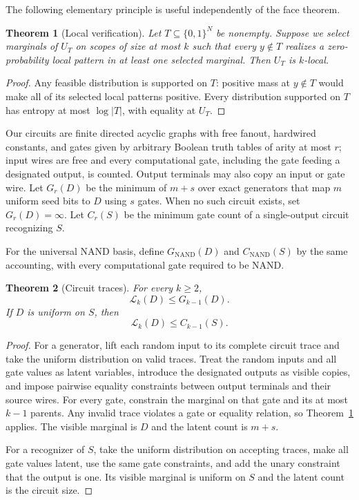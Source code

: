 \documentclass{article}
\newcommand{\LC}{\mathcal{L}}
\newcommand{\bits}{\{0,1\}}
\newtheorem{theorem}{Theorem}
\begin{document}
The following elementary principle is useful independently of the face
theorem.

\begin{theorem}[Local verification]\label{thm:local-verification}
Let $T\subseteq\bits^N$ be nonempty.  Suppose
we select marginals of $U_T$ on scopes of size at most $k$ such that every
$y\notin T$ realizes a zero-probability local pattern in at least one selected
marginal.  Then $U_T$ is $k$-local.
\end{theorem}

\begin{proof}
Any feasible distribution is supported on $T$: positive mass at $y\notin T$
would make all of its selected local patterns positive.  Every distribution
supported on $T$ has entropy at most $\log|T|$, with equality at $U_T$.
\end{proof}

Our circuits are finite directed acyclic graphs with free fanout, hardwired
constants, and gates given by arbitrary Boolean truth tables of arity at most
$r$; input wires are free and every computational gate, including the gate
feeding a designated output, is counted.  Output terminals may also copy an
input or gate wire.  Let $G_r(D)$ be the minimum of $m+s$ over exact generators
that map $m$ uniform seed bits to $D$ using $s$ gates.  When no such circuit
exists, set $G_r(D)=\infty$.  Let $C_r(S)$ be the minimum gate count of a
single-output circuit recognizing $S$.

For the universal NAND basis, define $G_{\mathrm{NAND}}(D)$ and
$C_{\mathrm{NAND}}(S)$ by the same accounting, with every computational gate
required to be NAND.

\begin{theorem}[Circuit traces]\label{thm:upper-bounds}
For every $k\ge2$,
\[
  \LC_k(D)\le G_{k-1}(D).
\]
If $D$ is uniform on $S$, then
\[
  \LC_k(D)\le C_{k-1}(S).
\]
\end{theorem}

\begin{proof}
For a generator, lift each random input to its complete circuit trace and take
the uniform distribution on valid traces.  Treat the random inputs and all gate
values as latent variables, introduce the designated outputs as visible copies,
and impose pairwise equality constraints between output terminals and their
source wires.  For every gate, constrain the marginal on that gate and its at
most $k-1$ parents.  Any invalid trace violates a gate or equality relation, so
Theorem~\ref{thm:local-verification} applies.  The visible marginal is $D$ and
the latent count is $m+s$.

For a recognizer of $S$, take the uniform distribution on accepting traces,
make all gate values latent, use the same gate constraints, and add the unary
constraint that the output is one.  Its visible marginal is uniform on $S$ and
the latent count is the circuit size.
\end{proof}
\end{document}
